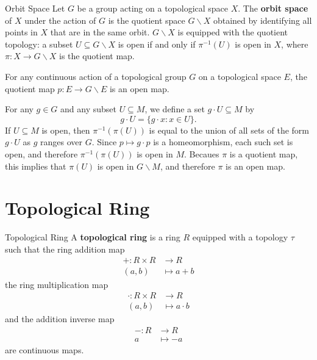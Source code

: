 \documentclass{report}
\begin{document}
\begin{definition}{Orbit Space}{}
	Let $G$ be a group acting on a topological space $X$. The \textbf{orbit space} of $X$ under the action of $G$ is the quotient space $G\backslash X $ obtained by identifying all points in $X$ that are in the same orbit. $G\backslash X $ is equipped with the quotient topology: a subset $U\subseteq G\backslash X $ is open if and only if $\pi^{-1}(U)$ is open in $X$, where $\pi:X\to  G\backslash X$ is the quotient map.
\end{definition}



\begin{proposition}{}{}
	For any continuous action of a topological group $G$ on a topological space $E$, the quotient map $p: E \rightarrow G\backslash E$ is an open map.
\end{proposition}

\begin{prf}
	For any $g \in G$ and any subset $U \subseteq M$, we define a set $g \cdot U \subseteq M$ by
	$$
		g \cdot U=\{g \cdot x: x \in U\} .
	$$
	If $U \subseteq M$ is open, then $\pi^{-1}(\pi(U))$ is equal to the union of all sets of the form $g \cdot U$ as $g$ ranges over $G$. Since $p \mapsto g \cdot p$ is a homeomorphism, each such set is open, and therefore $\pi^{-1}(\pi(U))$ is open in $M$. Becaues $\pi$ is a quotient map, this implies that $\pi(U)$ is open in $G\backslash M$, and therefore $\pi$ is an open map.
\end{prf}




\section{Topological Ring}
\begin{definition}{Topological Ring}{}
	A \textbf{topological ring} is a ring $R$ equipped with a topology $\tau$ such that the ring addition map
	\begin{align*}
		+:R\times R & \longrightarrow R \\
		(a,b)       & \longmapsto a+b
	\end{align*}
	the ring multiplication map
	\begin{align*}
		\cdot:R\times R & \longrightarrow R    \\
		(a,b)           & \longmapsto a\cdot b
	\end{align*}
	and the addition inverse map
	\begin{align*}
		-:R & \longrightarrow R \\
		a   & \longmapsto -a
	\end{align*}
	are continuous maps.
\end{definition}
\end{document}
